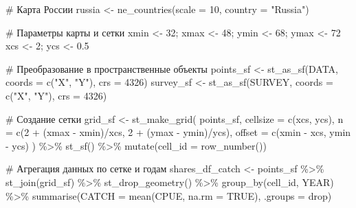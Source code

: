 \documentclass[
  letterpaper,
  DIV=11,
  numbers=noendperiod]{scrreprt}
\newenvironment{Shaded}{\begin{snugshade}}{\end{snugshade}}
\newcommand{\AttributeTok}[1]{\textcolor[rgb]{0.40,0.45,0.13}{#1}}
\newcommand{\CommentTok}[1]{\textcolor[rgb]{0.37,0.37,0.37}{#1}}
\newcommand{\ConstantTok}[1]{\textcolor[rgb]{0.56,0.35,0.01}{#1}}
\newcommand{\DecValTok}[1]{\textcolor[rgb]{0.68,0.00,0.00}{#1}}
\newcommand{\FloatTok}[1]{\textcolor[rgb]{0.68,0.00,0.00}{#1}}
\newcommand{\FunctionTok}[1]{\textcolor[rgb]{0.28,0.35,0.67}{#1}}
\newcommand{\NormalTok}[1]{\textcolor[rgb]{0.00,0.23,0.31}{#1}}
\newcommand{\OtherTok}[1]{\textcolor[rgb]{0.00,0.23,0.31}{#1}}
\newcommand{\SpecialCharTok}[1]{\textcolor[rgb]{0.37,0.37,0.37}{#1}}
\newcommand{\StringTok}[1]{\textcolor[rgb]{0.13,0.47,0.30}{#1}}
\begin{document}
\begin{Shaded}
\begin{Highlighting}[]
\CommentTok{\# Карта России}
\NormalTok{russia }\OtherTok{\textless{}{-}} \FunctionTok{ne\_countries}\NormalTok{(}\AttributeTok{scale =} \DecValTok{10}\NormalTok{, }\AttributeTok{country =} \StringTok{"Russia"}\NormalTok{) }

\CommentTok{\# Параметры карты и сетки}
\NormalTok{xmin }\OtherTok{\textless{}{-}} \DecValTok{32}\NormalTok{; xmax }\OtherTok{\textless{}{-}} \DecValTok{48}\NormalTok{; ymin }\OtherTok{\textless{}{-}} \DecValTok{68}\NormalTok{; ymax }\OtherTok{\textless{}{-}} \DecValTok{72}
\NormalTok{xcs }\OtherTok{\textless{}{-}} \DecValTok{2}\NormalTok{; ycs }\OtherTok{\textless{}{-}} \FloatTok{0.5}

\CommentTok{\# Преобразование в пространственные объекты}
\NormalTok{points\_sf }\OtherTok{\textless{}{-}} \FunctionTok{st\_as\_sf}\NormalTok{(DATA, }\AttributeTok{coords =} \FunctionTok{c}\NormalTok{(}\StringTok{"X"}\NormalTok{, }\StringTok{"Y"}\NormalTok{), }\AttributeTok{crs =} \DecValTok{4326}\NormalTok{)}
\NormalTok{survey\_sf }\OtherTok{\textless{}{-}} \FunctionTok{st\_as\_sf}\NormalTok{(SURVEY, }\AttributeTok{coords =} \FunctionTok{c}\NormalTok{(}\StringTok{"X"}\NormalTok{, }\StringTok{"Y"}\NormalTok{), }\AttributeTok{crs =} \DecValTok{4326}\NormalTok{)}

\CommentTok{\# Создание сетки}
\NormalTok{grid\_sf }\OtherTok{\textless{}{-}} \FunctionTok{st\_make\_grid}\NormalTok{(}
\NormalTok{  points\_sf,}
  \AttributeTok{cellsize =} \FunctionTok{c}\NormalTok{(xcs, ycs),}
  \AttributeTok{n =} \FunctionTok{c}\NormalTok{(}\DecValTok{2} \SpecialCharTok{+}\NormalTok{ (xmax }\SpecialCharTok{{-}}\NormalTok{ xmin)}\SpecialCharTok{/}\NormalTok{xcs, }\DecValTok{2} \SpecialCharTok{+}\NormalTok{ (ymax }\SpecialCharTok{{-}}\NormalTok{ ymin)}\SpecialCharTok{/}\NormalTok{ycs),}
  \AttributeTok{offset =} \FunctionTok{c}\NormalTok{(xmin }\SpecialCharTok{{-}}\NormalTok{ xcs, ymin }\SpecialCharTok{{-}}\NormalTok{ ycs)}
\NormalTok{) }\SpecialCharTok{\%\textgreater{}\%} 
  \FunctionTok{st\_sf}\NormalTok{() }\SpecialCharTok{\%\textgreater{}\%} 
  \FunctionTok{mutate}\NormalTok{(}\AttributeTok{cell\_id =} \FunctionTok{row\_number}\NormalTok{())}

\CommentTok{\# Агрегация данных по сетке и годам}
\NormalTok{shares\_df\_catch }\OtherTok{\textless{}{-}}\NormalTok{ points\_sf }\SpecialCharTok{\%\textgreater{}\%} 
  \FunctionTok{st\_join}\NormalTok{(grid\_sf) }\SpecialCharTok{\%\textgreater{}\%} 
  \FunctionTok{st\_drop\_geometry}\NormalTok{() }\SpecialCharTok{\%\textgreater{}\%} 
  \FunctionTok{group\_by}\NormalTok{(cell\_id, YEAR) }\SpecialCharTok{\%\textgreater{}\%} 
  \FunctionTok{summarise}\NormalTok{(}\AttributeTok{CATCH =} \FunctionTok{mean}\NormalTok{(CPUE, }\AttributeTok{na.rm =} \ConstantTok{TRUE}\NormalTok{), }\AttributeTok{.groups =} \StringTok{\textquotesingle{}drop\textquotesingle{}}\NormalTok{)}


\end{Highlighting}
\end{Shaded}
\end{document}
